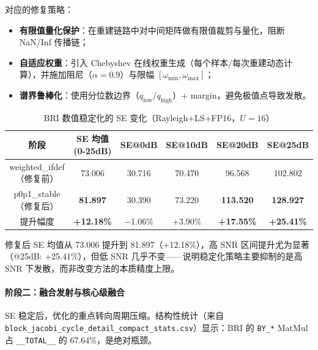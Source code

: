 \documentclass{CjC}
\begin{document}
    对应的修复策略：
    \begin{itemize}
        \item \textbf{有限值量化保护}：在重建链路中对中间矩阵做有限值裁剪与量化，阻断
            NaN/Inf 传播链；

        \item \textbf{自适应权重}：引入 Chebyshev 在线权重生成（每个样本/每次重建动态计算），并施加阻尼（$\alpha
            =0.9$）与限幅 $[\omega_{\min},\omega_{\max}]$；

        \item \textbf{谱界鲁棒化}：使用分位数边界（$q_{\text{low}}/q_{\text{high}}$）+
            margin，避免极值点导致发散。
    \end{itemize}

    \begin{table}[H]
        \centering
        \caption{BRI 数值稳定化的 SE 变化（Rayleigh+LS+FP16，$U=16$）}
        \begin{tabular}{c|ccccc}
            \toprule 阶段                   & SE 均值(0-25dB)     & SE@0dB    & SE@10dB & SE@20dB           & SE@25dB           \\
            \midrule weighted\_ifdef（修复前） & 73.006            & 30.716    & 70.470  & 96.568            & 102.802           \\
            p0p1\_stable（修复后）             & \textbf{81.897}   & 30.390    & 73.220  & \textbf{113.520}  & \textbf{128.927}  \\
            \midrule 提升幅度                 & \textbf{+12.18\%} & $-$1.06\% & +3.90\% & \textbf{+17.55\%} & \textbf{+25.41\%} \\
            \bottomrule
        \end{tabular}
    \end{table}

    修复后 SE 均值从 73.006 提升到 81.897（+12.18\%），高 SNR 区间提升尤为显著（@25dB:
    +25.41\%），但低 SNR 几乎不变——说明稳定化策略主要抑制的是高 SNR 下发散，而非改变方法的本质精度上限。

    \paragraph{阶段二：融合发射与核心级融合}

    SE 稳定后，优化的重点转向周期压缩。结构性统计（来自 \texttt{block\_jacobi\_cycle\_detail\_compact\_stats.csv}）显示：BRI
    的 \texttt{BY\_*} MatMul 占 \texttt{\_\_TOTAL\_\_} 的 67.64\%，是绝对瓶颈。
\end{document}

